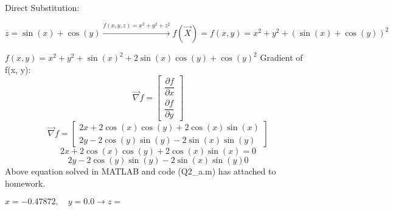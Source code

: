 Direct Substitution:


$z = \sin(x) + \cos(y) \xrightarrow{f(x, y, z) = x^2 + y^2 + z^ 2}
f(\vec{X}) = f(x, y) = x^2 + y^2 + (\sin(x)+\cos(y))^2
$


$f(x, y) = x^2 + y^2 + \sin(x)^2 + 2\sin(x)\cos(y) + \cos(y)^2$
Gradient of f(x, y):
$$\vec{\nabla} f = \begin{bmatrix}
	\dfrac{\partial f}{\partial x} \\[6pt]
	\dfrac{\partial f}{\partial y}
\end{bmatrix} $$
$$\vec{\nabla} f = \begin{bmatrix}
	2x + 2\cos(x)\cos(y) + 2\cos(x)\sin(x) \\
	2y - 2\cos(y)\sin(y) - 2\sin(x)\sin(y)
\end{bmatrix} $$
$$	2x + 2\cos(x)\cos(y) + 2\cos(x)\sin(x)=  0 $$
$$2y - 2\cos(y)\sin(y) - 2\sin(x)\sin(y) 0$$
Above equation solved in MATLAB and code (Q2\_a.m) has attached to homework.


$x = -0.47872, \quad y = 0.0 \to z =  $


